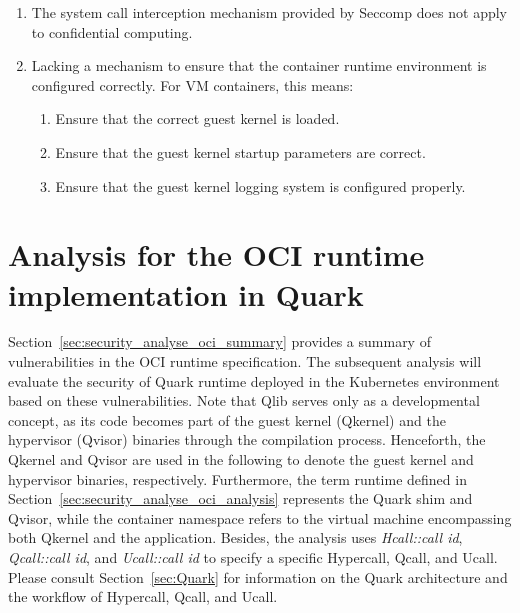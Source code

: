 \begin{enumerate}
  \item\label{vulnerabilities:7} The system call interception mechanism provided by Seccomp does not apply to confidential computing.
  \item\label{vulnerabilities:8} Lacking a mechanism to ensure that the container runtime environment is configured correctly. For VM containers, this means:
      \begin{enumerate}
        \item\label{vulnerabilities:9} Ensure that the correct guest kernel is loaded.
        \item\label{vulnerabilities:10} Ensure that the guest kernel startup parameters are correct.
        \item\label{vulnerabilities:11} Ensure that the guest kernel logging system is configured properly.
      \end{enumerate}
\end{enumerate}


\section{Analysis for the OCI runtime implementation in Quark}
\label{sec:security_analyse_quark_analysis}
Section~\ref{sec:security_analyse_oci_summary} provides a summary of vulnerabilities in the OCI runtime specification. The subsequent analysis will evaluate the security of Quark runtime deployed in the Kubernetes environment based on these vulnerabilities. Note that Qlib serves only as a developmental concept, as its code becomes part of the guest kernel (Qkernel) 
and the hypervisor (Qvisor) binaries through the compilation process. Henceforth, the Qkernel and Qvisor are used in the following to denote the guest kernel and hypervisor binaries, respectively. Furthermore, the term runtime defined in Section~\ref{sec:security_analyse_oci_analysis} represents the Quark shim and Qvisor, while the container namespace 
refers to the virtual machine encompassing both Qkernel and the application. Besides, the analysis uses \emph{Hcall::call id}, \emph{Qcall::call id}, and \emph{Ucall::call id} to specify a specific Hypercall, Qcall, and Ucall. Please consult Section~\ref{sec:Quark} for information on the Quark architecture and the workflow of Hypercall, Qcall, and Ucall.


